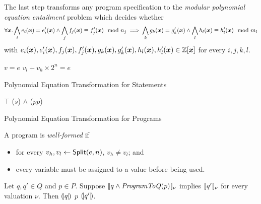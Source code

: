 
The last step transforms any program specification to the 
\emph{modular polynomial equation entailment} problem which decides
whether 
\[\forall \vx.
  \bigwedge\limits_i e_i (\vx) = e'_i (\vx) \wedge
  \bigwedge\limits_j f_j (\vx) \equiv f'_j (\vx) \mod n_j
  \implies
  \bigwedge\limits_k g_k (\vx) = g'_k (\vx) \wedge
  \bigwedge\limits_l   h_l (\vx) \equiv h'_l (\vx) \mod m_l
\]
with 
$e_i (\vx), e'_i (\vx), f_j (\vx), f'_j (\vx),
 g_k (\vx), g'_k (\vx), h_l (\vx), h'_l (\vx) \in \bbfZ[\vx]$
for every $i, j, k, l$.

\begin{algorithm}
  \begin{algorithmic}[1]
        \Return $v = e$
      \EndCase
        \Return $v_l + v_h \times 2^n = e$
      \EndCase
    \EndMatch
    \EndFunction
  \end{algorithmic}
  \caption{Polynomial Equation Transformation for Statements}
\end{algorithm}

\begin{algorithm}
  \begin{algorithmic}[1]
      \Case{$\epsilon$} \Return $\top$ \EndCase
        \Return {} ($s$) $\wedge$
                 ($pp$)
      \EndCase
    \EndMatch
    \EndFunction
  \end{algorithmic}
  \caption{Polynomial Equation Transformation for Programs}
  \label{algorithm:programtoq}
\end{algorithm}

\begin{definition}
  A program is \emph{well-formed} if
  \begin{itemize}
  \item for every $v_h, v_l \leftarrow \mbox{\textsf{Split}}(e, n)$, $v_h
    \neq v_l$; and
  \item every variable must be assigned to a value before being used.
  \end{itemize}
\end{definition}

\begin{theorem}
  \label{theorem:program-to-q-soundness}
  Let $q, q' \in Q$ and $p \in P$.
  Suppose $[\!|{q \wedge \textmd{\textit{ProgramToQ}}(p)}|\!]_\nu$
  implies $[\!|{q'}|\!]_\nu$ for every valuation $\nu$. 
  Then ${(\!|}{q}{|\!)}$ $p$ ${(\!|}{q'}{|\!)}$.
\end{theorem}

